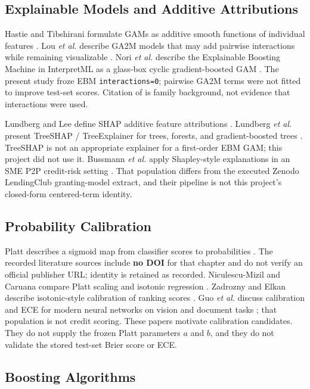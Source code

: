 \documentclass{ieeeaccess}
\begin{document}
\subsection{Explainable Models and Additive Attributions}

Hastie and Tibshirani formulate GAMs as additive smooth functions of individual features \cite{b9}. Lou \emph{et al.} describe GA2M models that may add pairwise interactions while remaining visualizable \cite{b10}. Nori \emph{et al.} describe the Explainable Boosting Machine in InterpretML as a glass-box cyclic gradient-boosted GAM \cite{b11}. The present study froze EBM \texttt{interactions=0}; pairwise GA2M terms were not fitted to improve test-set scores. Citation of \cite{b10} is family background, not evidence that interactions were used.

Lundberg and Lee define SHAP additive feature attributions \cite{b12}. Lundberg \emph{et al.} present TreeSHAP / TreeExplainer for trees, forests, and gradient-boosted trees \cite{b13}. TreeSHAP is not an appropriate explainer for a first-order EBM GAM; this project did not use it. Bussmann \emph{et al.} apply Shapley-style explanations in an SME P2P credit-risk setting \cite{b7}. That population differs from the executed Zenodo LendingClub granting-model extract, and their pipeline is not this project's closed-form centered-term identity.

\subsection{Probability Calibration}

Platt describes a sigmoid map from classifier scores to probabilities \cite{b14}. The recorded literature sources include \textbf{no DOI} for that chapter and do not verify an official publisher URL; identity is retained as recorded. Niculescu-Mizil and Caruana compare Platt scaling and isotonic regression \cite{b15}. Zadrozny and Elkan describe isotonic-style calibration of ranking scores \cite{b16}. Guo \emph{et al.} discuss calibration and ECE for modern neural networks on vision and document tasks \cite{b17}; that population is not credit scoring. These papers motivate calibration candidates. They do not supply the frozen Platt parameters \(a\) and \(b\), and they do not validate the stored test-set Brier score or ECE.

\subsection{Boosting Algorithms}
\end{document}
